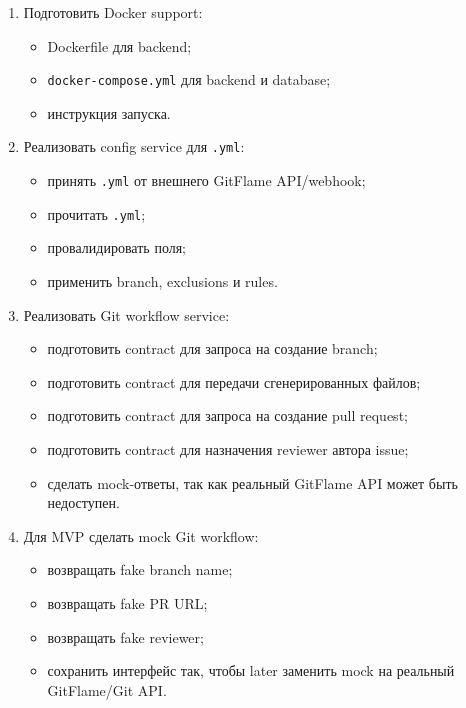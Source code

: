\documentclass[12pt,a4paper]{article}
\begin{document}
\begin{enumerate}
    \item Подготовить Docker support:
    \begin{itemize}
        \item Dockerfile для backend;
        \item \texttt{docker-compose.yml} для backend и database;
        \item инструкция запуска.
    \end{itemize}

    \item Реализовать config service для \texttt{.yml}:
    \begin{itemize}
        \item принять \texttt{.yml} от внешнего GitFlame API/webhook;
        \item прочитать \texttt{.yml};
        \item провалидировать поля;
        \item применить branch, exclusions и rules.
    \end{itemize}

    \item Реализовать Git workflow service:
    \begin{itemize}
        \item подготовить contract для запроса на создание branch;
        \item подготовить contract для передачи сгенерированных файлов;
        \item подготовить contract для запроса на создание pull request;
        \item подготовить contract для назначения reviewer автора issue;
        \item сделать mock-ответы, так как реальный GitFlame API может быть недоступен.
    \end{itemize}

    \item Для MVP сделать mock Git workflow:
    \begin{itemize}
        \item возвращать fake branch name;
        \item возвращать fake PR URL;
        \item возвращать fake reviewer;
        \item сохранить интерфейс так, чтобы later заменить mock на реальный GitFlame/Git API.
    \end{itemize}
\end{enumerate}
\end{document}
